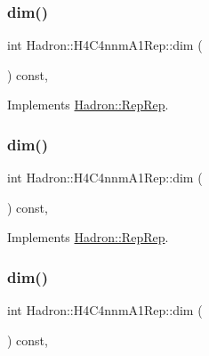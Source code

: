 \subsubsection{\texorpdfstring{dim()}{dim()}\hspace{0.1cm}{\footnotesize\ttfamily [3/5]}}
{\footnotesize\ttfamily int Hadron\+::\+H4\+C4nnm\+A1\+Rep\+::dim (\begin{DoxyParamCaption}{ }\end{DoxyParamCaption}) const\hspace{0.3cm}{\ttfamily [inline]}, {\ttfamily [virtual]}}



Implements \mbox{\hyperlink{structHadron_1_1RepRep_a92c8802e5ed7afd7da43ccfd5b7cd92b}{Hadron\+::\+Rep\+Rep}}.

\mbox{\label{structHadron_1_1H4C4nnmA1Rep_a4712bc0c0495973cbd377882020b130f}} 
\subsubsection{\texorpdfstring{dim()}{dim()}\hspace{0.1cm}{\footnotesize\ttfamily [4/5]}}
{\footnotesize\ttfamily int Hadron\+::\+H4\+C4nnm\+A1\+Rep\+::dim (\begin{DoxyParamCaption}{ }\end{DoxyParamCaption}) const\hspace{0.3cm}{\ttfamily [inline]}, {\ttfamily [virtual]}}



Implements \mbox{\hyperlink{structHadron_1_1RepRep_a92c8802e5ed7afd7da43ccfd5b7cd92b}{Hadron\+::\+Rep\+Rep}}.

\mbox{\label{structHadron_1_1H4C4nnmA1Rep_a4712bc0c0495973cbd377882020b130f}} 
\subsubsection{\texorpdfstring{dim()}{dim()}\hspace{0.1cm}{\footnotesize\ttfamily [5/5]}}
{\footnotesize\ttfamily int Hadron\+::\+H4\+C4nnm\+A1\+Rep\+::dim (\begin{DoxyParamCaption}{ }\end{DoxyParamCaption}) const\hspace{0.3cm}{\ttfamily [inline]}, {\ttfamily [virtual]}}



